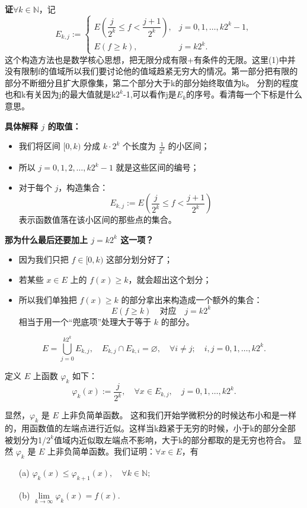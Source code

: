 \documentclass[lang=cn,10pt]{elegantbook}
\begin{document}
\textbf{证}\quad $\forall k \in \mathbb{N}$，记
\[
E_{k,j} := 
\begin{cases}
E\left( \dfrac{j}{2^k} \leq f < \dfrac{j+1}{2^k} \right), & j = 0, 1, \dots, k2^k - 1, \\
E(f \geq k), & j = k2^k.
\end{cases}
\]
这个构造方法也是数学核心思想，把无限分成有限+有条件的无限。这里(1)中并没有限制f的值域所以我们要讨论他的值域趋紧无穷大的情况。第一部分把有限的部分不断细分且扩大原像集，第二个部分大于k的部分始终取值为k。
分割的程度也和k有关因为j的最大值就是k$2^k$-1,可以看作j是$E_k$的序号。看清每一个下标是什么意思。
\begin{itemize}
   \textbf{具体解释 $j$ 的取值：}
  \begin{itemize}
    \item 我们将区间 $[0, k)$ 分成 $k \cdot 2^k$ 个长度为 $\frac{1}{2^k}$ 的小区间；
    \item 所以 $j = 0, 1, 2, \dots, k2^k - 1$ 就是这些区间的编号；
    \item 对于每个 $j$，构造集合：
    \[
    E_{k,j} := E\left( \frac{j}{2^k} \leq f < \frac{j+1}{2^k} \right)
    \]
    表示函数值落在该小区间的那些点的集合。
  \end{itemize}
  
   \textbf{那为什么最后还要加上 $j = k2^k$ 这一项？}
  \begin{itemize}
    \item 因为我们只把 $f \in [0, k)$ 这部分划分好了；
    \item 若某些 $x \in E$ 上的 $f(x) \geq k$，就会超出这个划分；
    \item 所以我们单独把 $f(x) \geq k$ 的部分拿出来构造成一个额外的集合：
    \[
    E(f \geq k) \quad \text{对应} \quad j = k2^k
    \]
    相当于用一个“兜底项”处理大于等于 $k$ 的部分。
  \end{itemize}
\end{itemize}
\[
E = \bigcup_{j=0}^{k 2^k} E_{k,j}, \quad E_{k,j} \cap E_{k,i} = \varnothing, \quad \forall i \ne j; \quad i,j = 0,1,\dots,k 2^k.
\]

定义 $E$ 上函数 $\varphi_k$ 如下：
\[
\varphi_k(x) := \frac{j}{2^k}, \quad \forall x \in E_{k,j}, \quad j = 0,1,\dots,k 2^k.
\]

显然，$\varphi_k$ 是 $E$ 上非负简单函数。
这和我们开始学微积分的时候达布小和是一样的，用函数值的左端点进行近似。这样当k趋紧于无穷的时候，小于k的部分全部被划分为1/$2^k$值域内近似取左端点不影响，大于k的部分都取的是无穷也符合。
显然 $\varphi_k$ 是 $E$ 上非负简单函数。我们证明：$\forall x \in E$，有
\begin{itemize}
    \item[(a)] $\varphi_k(x) \leq \varphi_{k+1}(x), \quad \forall k \in \mathbb{N};$
    \item[(b)] $\lim\limits_{k \to \infty} \varphi_k(x) = f(x)$.
\end{itemize}
\end{document}
